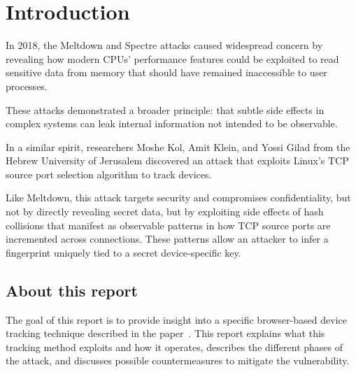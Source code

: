 \documentclass[twocolumn]{report}
\begin{document}
\fontsize{7pt}{8pt}\selectfont
{}



\tableofcontents
\thispagestyle{empty}
\clearpage
\pagestyle{plain}


\clearpage
{}
\pagestyle{default}

\section{Introduction}
\label{sec:introduction}

In 2018, the \alert{Meltdown} and \alert{Spectre} attacks caused widespread concern by revealing how modern CPUs’ performance features could be exploited to read sensitive data from memory that should have remained inaccessible to user processes.

These attacks demonstrated a broader principle: that subtle side effects in complex systems can leak internal information not intended to be observable.

In a similar spirit, researchers Moshe Kol, Amit Klein, and Yossi Gilad from the Hebrew University of Jerusalem discovered an attack that exploits Linux’s \alert{TCP source port selection algorithm} to track devices.

Like Meltdown, this attack targets \alert{security} and compromises confidentiality, but not by directly revealing secret data, but by exploiting side effects of \alert{hash collisions} that manifest as observable patterns in how \alert{TCP source ports} are incremented across connections. These patterns allow an attacker to infer a fingerprint uniquely tied to a \alert{secret device-specific key}.

\subsection{About this report}
\label{sec:goal_of_this_report}

The goal of this report is to provide insight into a specific browser-based device tracking technique described in the paper~\cite{kol2022devicetrackinglinuxsnew}. This report explains what this tracking method exploits and how it operates, describes the different phases of the attack, and discusses possible countermeasures to mitigate the vulnerability.
\end{document}
